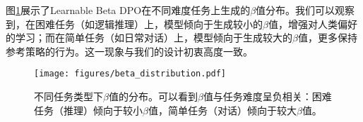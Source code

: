 图\ref{fig:beta_distribution}展示了Learnable Beta DPO在不同难度任务上生成的$\beta$值分布。我们可以观察到，在困难任务（如逻辑推理）上，模型倾向于生成较小的$\beta$值，增强对人类偏好的学习；而在简单任务（如日常对话）上，模型倾向于生成较大的$\beta$值，更多保持参考策略的行为。这一现象与我们的设计初衷高度一致。

\begin{figure}[h]
    \centering
    \texttt{[image: figures/beta\_distribution.pdf]}
    \caption{不同任务类型下$\beta$值的分布。可以看到$\beta$值与任务难度呈负相关：困难任务（推理）倾向于较小$\beta$值，简单任务（对话）倾向于较大$\beta$值。}
    \label{fig:beta_distribution}
\end{figure} 
